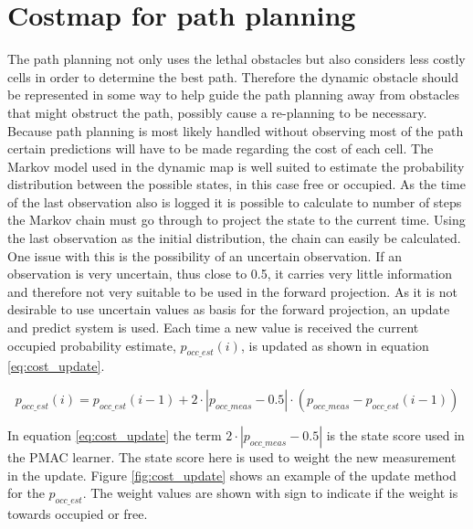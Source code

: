 \section{Costmap for path planning}
\label{sec:cost_interpretation_path_planning}
The path planning not only uses the lethal obstacles but also considers less costly cells in order to determine the best path. Therefore the dynamic obstacle should be represented in some way to help guide the path planning away from obstacles that might obstruct the path, possibly cause a re-planning to be necessary. Because path planning is most likely handled without observing most of the path certain predictions will have to be made regarding the cost of each cell. The Markov model used in the dynamic map is well suited to estimate the probability distribution between the possible states, in this case free or occupied. 
As the time of the last observation also is logged it is possible to calculate to number of steps the Markov chain must go through to project the state to the current time. Using the last observation as the initial distribution, the chain can easily be calculated. One issue with this is the possibility of an uncertain observation. If an observation is very uncertain, thus close to 0.5, it carries very little information and therefore not very suitable to be used in the forward projection. As it is not desirable to use uncertain values as basis for the forward projection, an update and predict system is used. Each time a new value is received the current occupied probability estimate, \(p_{occ\_est}(i)\), is updated as shown in equation \ref{eq:cost_update}.

\begin{equation}
\label{eq:cost_update}
p_{occ\_est}(i) = p_{occ\_est}(i-1) +  2 \cdot |p_{occ\_meas} - 0.5| \cdot (p_{occ\_meas} - p_{occ\_est}(i-1))
\end{equation}

In equation \ref{eq:cost_update} the term  \(2 \cdot |p_{occ\_meas} -0.5|\) is the state score used in the PMAC learner. The state score here is used to weight the new measurement in the update. Figure \ref{fig:cost_update} shows an example of the update method for the \(p_{occ\_est}\). The weight values are shown with sign to indicate if the weight is towards occupied or free. 

